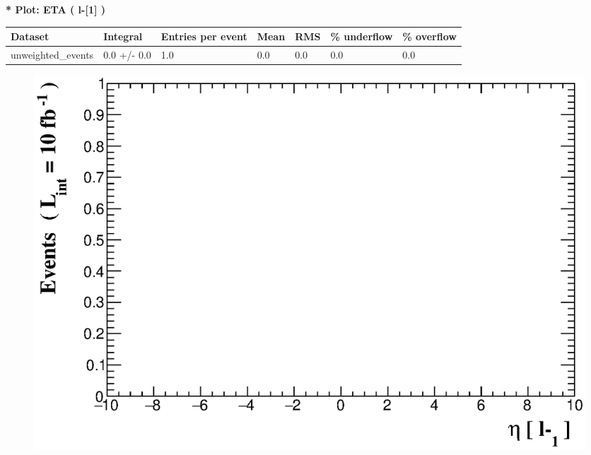 \documentclass[a4paper, 10pt]{article}
\begin{document}
\textbf{* Plot: ETA ( l-[1] ) }\\
   \begin{table}[H]
  \begin{center}
    \begin{tabular}{|m{23.0mm}|m{23.0mm}|m{18.0mm}|m{19.0mm}|m{19.0mm}|m{19.0mm}|m{19.0mm}|}
      \hline
      {\cellcolor{yellow}         Dataset}& {\cellcolor{yellow}         Integral}& {\cellcolor{yellow}         Entries per event}& {\cellcolor{yellow}         Mean}& {\cellcolor{yellow}         RMS}& {\cellcolor{yellow}         \% underflow}& {\cellcolor{yellow}         \% overflow}\\
      \hline
      {\cellcolor{white}         unweighted\_events}& {\cellcolor{white}         0.0 +/\-- 0.0}& {\cellcolor{white}         1.0}& {\cellcolor{white}         0.0}& {\cellcolor{white}         0.0}& {\cellcolor{green}         0.0}& {\cellcolor{green}         0.0}\\
\hline
    \end{tabular}
  \end{center}
\end{table}

\begin{figure}[H]
  \begin{center}
    \includegraphics[scale=0.45]{selection_6.eps}\\
\caption{   }
  \end{center}
\end{figure}
      
\end{document}

